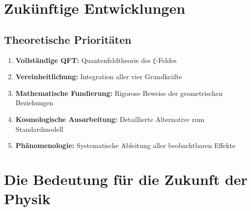 \documentclass[12pt,a4paper]{article}
\begin{document}
	\section{Zukünftige Entwicklungen}
	
	\subsection{Theoretische Prioritäten}
	
	\begin{enumerate}
		\item \textbf{Vollständige QFT:} Quantenfeldtheorie des $\xi$-Feldes
		\item \textbf{Vereinheitlichung:} Integration aller vier Grundkräfte
		\item \textbf{Mathematische Fundierung:} Rigorose Beweise der geometrischen Beziehungen
		\item \textbf{Kosmologische Ausarbeitung:} Detaillierte Alternative zum Standardmodell
		\item \textbf{Phänomenologie:} Systematische Ableitung aller beobachtbaren Effekte
	\end{enumerate}
	
	
	
	\section{Die Bedeutung für die Zukunft der Physik}
	
\end{document}
